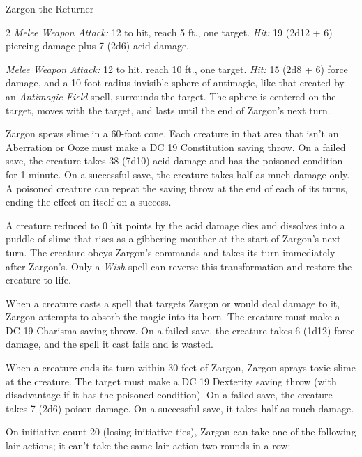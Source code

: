 \documentclass[10pt,a4paper,twoside,bg=print,twocolumn,openany,nodeprecatedcode]{dndbook}
\begin{document}
\begin{DndMonster}[float*=b,width=\textwidth + 8pt]{Zargon the Returner}
\begin{multicols}{2}
\textsl{Melee Weapon Attack:} 12 to hit, reach 5 ft., one target. \textsl{Hit:} 19 (2d12 + 6) piercing damage plus 7 (2d6) acid damage.

\textsl{Melee Weapon Attack:} 12 to hit, reach 10 ft., one target. \textsl{Hit:} 15 (2d8 + 6) force damage, and a 10-foot-radius invisible sphere of antimagic, like that created by an \textit{Antimagic Field} spell, surrounds the target. The sphere is centered on the target, moves with the target, and lasts until the end of Zargon's next turn.

Zargon spews slime in a 60-foot cone. Each creature in that area that isn't an Aberration or Ooze must make a DC 19 Constitution saving throw. On a failed save, the creature takes 38 (7d10) acid damage and has the poisoned condition for 1 minute. On a successful save, the creature takes half as much damage only. A poisoned creature can repeat the saving throw at the end of each of its turns, ending the effect on itself on a success.

A creature reduced to 0 hit points by the acid damage dies and dissolves into a puddle of slime that rises as a gibbering mouther at the start of Zargon's next turn. The creature obeys Zargon's commands and takes its turn immediately after Zargon's. Only a \textit{Wish} spell can reverse this transformation and restore the creature to life.

When a creature casts a spell that targets Zargon or would deal damage to it, Zargon attempts to absorb the magic into its horn. The creature must make a DC 19 Charisma saving throw. On a failed save, the creature takes 6 (1d12) force damage, and the spell it cast fails and is wasted.

When a creature ends its turn within 30 feet of Zargon, Zargon sprays toxic slime at the creature. The target must make a DC 19 Dexterity saving throw (with disadvantage if it has the poisoned condition). On a failed save, the creature takes 7 (2d6) poison damage. On a successful save, it takes half as much damage.

On initiative count 20 (losing initiative ties), Zargon can take one of the following lair actions; it can't take the same lair action two rounds in a row:



\end{multicols}
\end{DndMonster}
\end{document}
